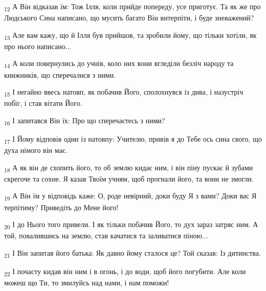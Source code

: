 \begin{tcolorbox}
\textsubscript{12} А Він відказав їм: Тож Ілля, коли прийде попереду, усе приготує. Та як же про Людського Сина написано, що мусить багато Він витерпіти, і буде зневажений?
\end{tcolorbox}
\begin{tcolorbox}
\textsubscript{13} Але вам кажу, що й Ілля був прийшов, та зробили йому, що тільки хотіли, як про нього написано...
\end{tcolorbox}
\begin{tcolorbox}
\textsubscript{14} А коли повернулись до учнів, коло них вони вгледіли безліч народу та книжників, що сперечалися з ними.
\end{tcolorbox}
\begin{tcolorbox}
\textsubscript{15} І негайно ввесь натовп, як побачив Його, сполохнувся із дива, і назустріч побіг, і став вітати Його.
\end{tcolorbox}
\begin{tcolorbox}
\textsubscript{16} І запитався Він їх: Про що сперечаєтесь з ними?
\end{tcolorbox}
\begin{tcolorbox}
\textsubscript{17} І Йому відповів один із натовпу: Учителю, привів я до Тебе ось сина свого, що духа німого він має.
\end{tcolorbox}
\begin{tcolorbox}
\textsubscript{18} А як він де схопить його, то об землю кидає ним, і він піну пускає й зубами скрегоче та сохне. Я казав Твоїм учням, щоб прогнали його, та вони не змогли.
\end{tcolorbox}
\begin{tcolorbox}
\textsubscript{19} А Він їм у відповідь каже: О, роде невірний, доки буду Я з вами? Доки вас Я терпітиму? Приведіть до Мене його!
\end{tcolorbox}
\begin{tcolorbox}
\textsubscript{20} І до Нього того привели. І як тільки побачив Його, то дух зараз затряс ним. А той, повалившись на землю, став качатися та заливатися піною...
\end{tcolorbox}
\begin{tcolorbox}
\textsubscript{21} І Він запитав його батька: Як давно йому сталося це? Той сказав: Із дитинства.
\end{tcolorbox}
\begin{tcolorbox}
\textsubscript{22} І почасту кидав він ним і в огонь, і до води, щоб його погубити. Але коли можеш що Ти, то змилуйсь над нами, і нам поможи!
\end{tcolorbox}
